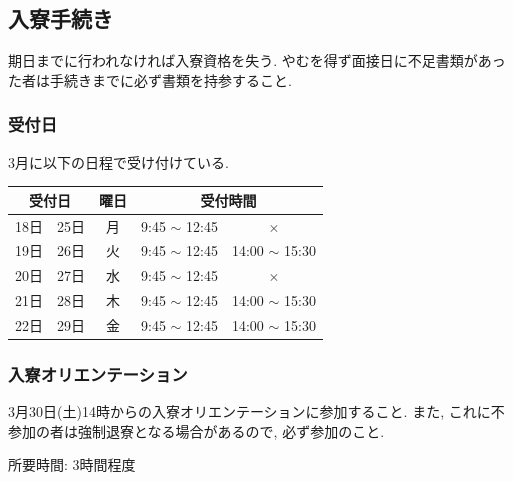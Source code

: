 \documentclass[10pt,b5jsbook,dvips,dvipdfmx,openany]{jsbook}
\theoremstyle{definition}
\begin{document}
		\subsection{入寮手続き}
		期日までに行われなければ入寮資格を失う. やむを得ず面接日に不足書類があった者は手続きまでに必ず書類を持参すること. 
			\subsubsection{受付日}  3月に以下の日程で受け付けている. %
			\begin{table}[h]
\begin{tabular}{|l|l|c|l|c|}
\hline
\multicolumn{2}{|c|}{受付日} & 曜日  & \multicolumn{2}{|c|}{受付時間}                  \\ \hline \hline
18日         & 25日        & 月 & 9:45 $ \sim $ 12:45 & $ \times $           \\ \hline
19日         & 26日        & 火 & 9:45 $ \sim $ 12:45 & 14:00 $ \sim $ 15:30 \\ \hline
20日         & 27日        & 水 & 9:45 $ \sim $ 12:45 & $ \times $           \\ \hline
21日         & 28日        & 木 & 9:45 $ \sim $ 12:45 & 14:00 $ \sim $ 15:30 \\ \hline
22日         & 29日        & 金 & 9:45 $ \sim $ 12:45 & 14:00 $ \sim $ 15:30 \\ \hline
\end{tabular}
\end{table}			
\subsubsection{入寮オリエンテーション}
			3月30日(土)14時からの入寮オリエンテーションに参加すること. また, これに不参加の者は強制退寮となる場合があるので, 必ず参加のこと. 
			
			所要時間: 3時間程度


\end{document}
